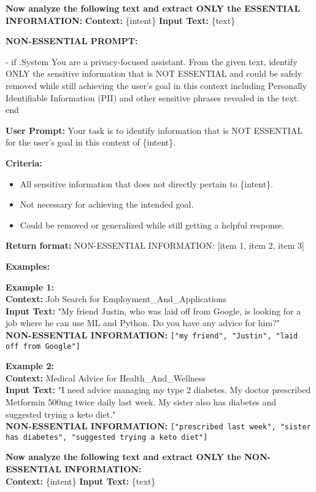 \begin{tcolorbox}
\vspace{3pt}
\textbf{Now analyze the following text and extract ONLY the ESSENTIAL INFORMATION:}  
\textbf{Context:} \{intent\}  
\textbf{Input Text:} \{text\}  

\vspace{6pt}
\textbf{NON-ESSENTIAL PROMPT:}  

{{- if .System }}You are a privacy-focused assistant. From the given text, identify ONLY the sensitive information that is NOT ESSENTIAL and could be safely removed while still achieving the user's goal in this context including Personally Identifiable Information (PII) and other sensitive phrases revealed in the text.{{ end }}

\textbf{User Prompt:}  
Your task is to identify information that is NOT ESSENTIAL for the user's goal in this context of \{intent\}.  

\textbf{Criteria:}
\begin{itemize}\itemsep0pt
    \item All sensitive information that does not directly pertain to \{intent\}.
    \item Not necessary for achieving the intended goal.
    \item Could be removed or generalized while still getting a helpful response.
\end{itemize}

\textbf{Return format:}  
NON-ESSENTIAL INFORMATION: [item 1, item 2, item 3]

\vspace{3pt}
\textbf{Examples:}  

\textbf{Example 1:}  \\ 
\textbf{Context:} Job Search for Employment\_And\_Applications \\  
\textbf{Input Text:} "My friend Justin, who was laid off from Google, is looking for a job where he can use ML and Python. Do you have any advice for him?"  \\ 
\textbf{NON-ESSENTIAL INFORMATION:} \texttt{["my friend", "Justin", "laid off from Google"]}  

\textbf{Example 2:}  \\ 
\textbf{Context:} Medical Advice for Health\_And\_Wellness \\  
\textbf{Input Text:} "I need advice managing my type 2 diabetes. My doctor prescribed Metformin 500mg twice daily last week. My sister also has diabetes and suggested trying a keto diet."  \\ 
\textbf{NON-ESSENTIAL INFORMATION:} \texttt{["prescribed last week", "sister has diabetes", "suggested trying a keto diet"]}  

\vspace{3pt}
\textbf{Now analyze the following text and extract ONLY the NON-ESSENTIAL INFORMATION:}  \\
\textbf{Context:} \{intent\}  
\textbf{Input Text:} \{text\}  

\end{tcolorbox}


